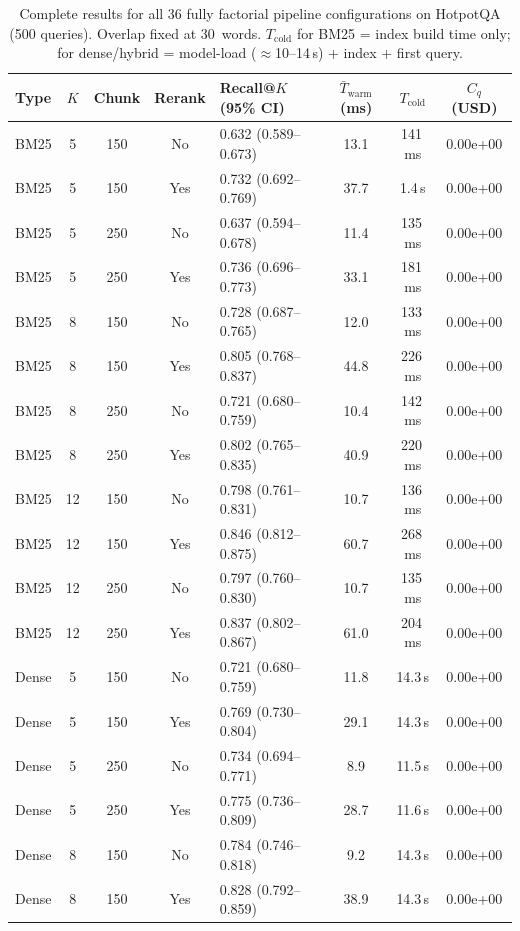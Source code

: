 \begin{table}[ht]
\centering
\small
\caption{Complete results for all 36 fully factorial pipeline configurations on HotpotQA (500 queries). Overlap fixed at 30~words. $T_\mathrm{cold}$ for BM25 = index build time only; for dense/hybrid = model-load ($\approx$10--14\,s) + index + first query.}
\label{tab:full_results}
\begin{tabular}{lccclccc}
\toprule
Type & $K$ & Chunk & Rerank & Recall@$K$ (95\% CI) & $\bar{T}_\mathrm{warm}$ (ms) & $T_\mathrm{cold}$ & $C_q$ (USD) \\
\midrule
BM25 & 5 & 150 & No & 0.632 (0.589--0.673) & 13.1 & 141\,ms & 0.00e+00 \\
BM25 & 5 & 150 & Yes & 0.732 (0.692--0.769) & 37.7 & 1.4\,s & 0.00e+00 \\
BM25 & 5 & 250 & No & 0.637 (0.594--0.678) & 11.4 & 135\,ms & 0.00e+00 \\
BM25 & 5 & 250 & Yes & 0.736 (0.696--0.773) & 33.1 & 181\,ms & 0.00e+00 \\
BM25 & 8 & 150 & No & 0.728 (0.687--0.765) & 12.0 & 133\,ms & 0.00e+00 \\
BM25 & 8 & 150 & Yes & 0.805 (0.768--0.837) & 44.8 & 226\,ms & 0.00e+00 \\
BM25 & 8 & 250 & No & 0.721 (0.680--0.759) & 10.4 & 142\,ms & 0.00e+00 \\
BM25 & 8 & 250 & Yes & 0.802 (0.765--0.835) & 40.9 & 220\,ms & 0.00e+00 \\
BM25 & 12 & 150 & No & 0.798 (0.761--0.831) & 10.7 & 136\,ms & 0.00e+00 \\
BM25 & 12 & 150 & Yes & 0.846 (0.812--0.875) & 60.7 & 268\,ms & 0.00e+00 \\
BM25 & 12 & 250 & No & 0.797 (0.760--0.830) & 10.7 & 135\,ms & 0.00e+00 \\
BM25 & 12 & 250 & Yes & 0.837 (0.802--0.867) & 61.0 & 204\,ms & 0.00e+00 \\
\midrule
Dense & 5 & 150 & No & 0.721 (0.680--0.759) & 11.8 & 14.3\,s & 0.00e+00 \\
Dense & 5 & 150 & Yes & 0.769 (0.730--0.804) & 29.1 & 14.3\,s & 0.00e+00 \\
Dense & 5 & 250 & No & 0.734 (0.694--0.771) & 8.9 & 11.5\,s & 0.00e+00 \\
Dense & 5 & 250 & Yes & 0.775 (0.736--0.809) & 28.7 & 11.6\,s & 0.00e+00 \\
Dense & 8 & 150 & No & 0.784 (0.746--0.818) & 9.2 & 14.3\,s & 0.00e+00 \\
Dense & 8 & 150 & Yes & 0.828 (0.792--0.859) & 38.9 & 14.3\,s & 0.00e+00 \\

\end{tabular}
\end{table}
